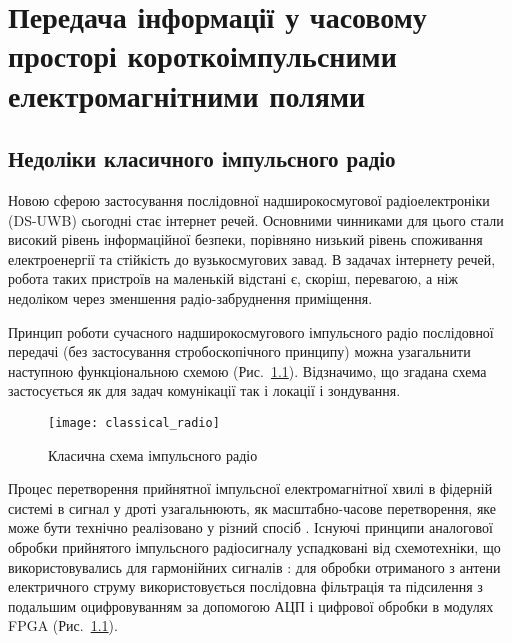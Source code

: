 \chapter{Передача інформації у часовому просторі короткоімпульсними 
електромагнітними полями}
\label{ch:neuron}

\section{Недоліки класичного імпульсного радіо}


Новою сферою застосування послідовної 
надширокосмугової радіоелектроніки (DS-UWB) сьогодні стає інтернет речей. 
Основними чинниками для цього стали високий рівень інформаційної безпеки, 
порівняно низький рівень споживання електроенергії та стійкість до 
вузькосмугових завад. В задачах інтернету речей, робота таких пристроїв на 
маленькій відстані є, скоріш, перевагою, а ніж недоліком через
зменшення радіо-забруднення приміщення.

Принцип роботи сучасного надширокосмугового імпульсного радіо 
послідовної передачі (без застосування стробоскопічного принципу) 
\cite{imp:ChannelImplementation} можна узагальнити наступною 
функціональною схемою (Рис.~\ref{fig:emp_radio}). Відзначимо, що згадана
схема застосується як для задач комунікації так і локації і зондування.

\begin{figure}[htbp] \begin{center}
\texttt{[image: classical\_radio]}
\caption{Класична схема імпульсного радіо} \label{fig:emp_radio}
\end{center} \end{figure}

Процес перетворення прийнятної імпульсної електромагнітної хвилі в фідерній 
системі в сигнал у дроті узагальнюють, як масштабно-часове перетворення, яке 
може бути технічно реалізовано у різний спосіб \cite{imp:Astanin1989}. 
Існуючі принципи аналогової обробки прийнятого імпульсного радіосигналу 
успадковані від схемотехніки, що використовувались для гармонійних сигналів 
\cite{imp:ComunicationsOverview}: для обробки отриманого з антени 
електричного струму використовується послідовна фільтрація та підсилення з 
подальшим оцифровуванням за допомогою АЦП і цифрової обробки в модулях 
FPGA (Рис.~\ref{fig:emp_radio}).

